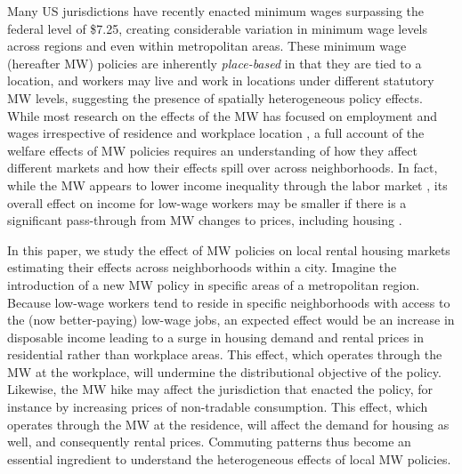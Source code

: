 

Many US jurisdictions have recently enacted minimum wages surpassing the 
federal level of \$7.25, creating considerable variation in minimum wage 
levels across regions and even within metropolitan areas.
These minimum wage (hereafter MW) policies are inherently \textit{place-based} 
in that they are tied to a location, and workers may live and work in locations 
under different statutory MW levels, suggesting the presence of spatially 
heterogeneous policy effects.
While most research on the effects of the MW has focused on employment and 
wages irrespective of residence and workplace location
\parencite[e.g.,][]{CardKrueger1994, CegnizEtAl2019},
a full account of the welfare effects of MW policies requires an understanding 
of how they affect different markets and how their effects spill over across 
neighborhoods.
In fact, while the MW appears to lower income inequality through the labor 
market \parencite{Lee1999, AutorEtAl2016},
its overall effect on income for low-wage workers may be smaller if there is 
a significant pass-through from MW changes to prices, including housing
\parencite{Macurdy2015}.

In this paper, we study the effect of MW policies on local rental housing 
markets estimating their effects across neighborhoods within a city.
Imagine the introduction of a new MW policy in specific areas of a metropolitan 
region.
Because low-wage workers tend to reside in specific neighborhoods with access 
to the (now better-paying) low-wage jobs,
an expected effect would be an increase in disposable income leading to a 
surge in housing demand and rental prices in residential rather than workplace 
areas.
This effect, which operates through the MW at the workplace, will undermine 
the distributional objective of the policy.
Likewise, the MW hike may affect the jurisdiction that enacted the policy, for 
instance by increasing prices of non-tradable consumption.
This effect, which operates through the MW at the residence, will affect the 
demand for housing as well, and consequently rental prices.
Commuting patterns thus become an essential ingredient to understand the 
heterogeneous effects of local MW policies.

